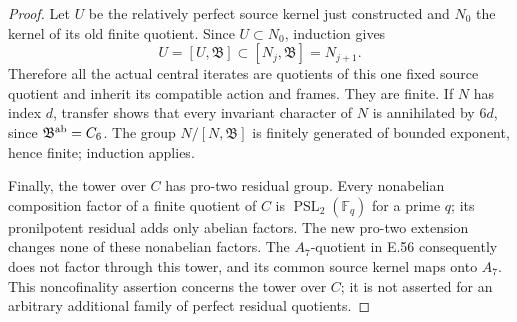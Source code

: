 \begin{proof}
Let \(U\) be the relatively perfect source kernel just constructed
and \(N_0\) the kernel of its old finite quotient.  Since
\(U\subset N_0\), induction gives
\[
 U=[U,\mathfrak B]\subset[N_j,\mathfrak B]=N_{j+1}.
                                                        \tag{E.92.7}
\]
Therefore all the actual central iterates are quotients of this
one fixed source quotient and inherit its compatible action and
frames.  They are finite.  If \(N\) has index \(d\), transfer
shows that every invariant character of \(N\) is annihilated
by \(6d\), since \(\mathfrak B^{\rm ab}=C_6\).
The group \(N/[N,\mathfrak B]\) is finitely generated of
bounded exponent, hence finite; induction applies.

Finally, the tower over \(C\) has pro-two residual group.
Every nonabelian composition factor of a finite quotient of \(C\)
is \(\operatorname{PSL}_2(\mathbb F_q)\) for a prime \(q\);
its pronilpotent residual adds only abelian factors.
The new pro-two extension changes none of these nonabelian factors.
The \(A_7\)-quotient in E.56 consequently does not factor through
this tower, and its common source kernel maps onto \(A_7\).
This noncofinality assertion concerns the tower over \(C\);
it is not asserted for an arbitrary additional family of perfect
residual quotients.
\end{proof}

